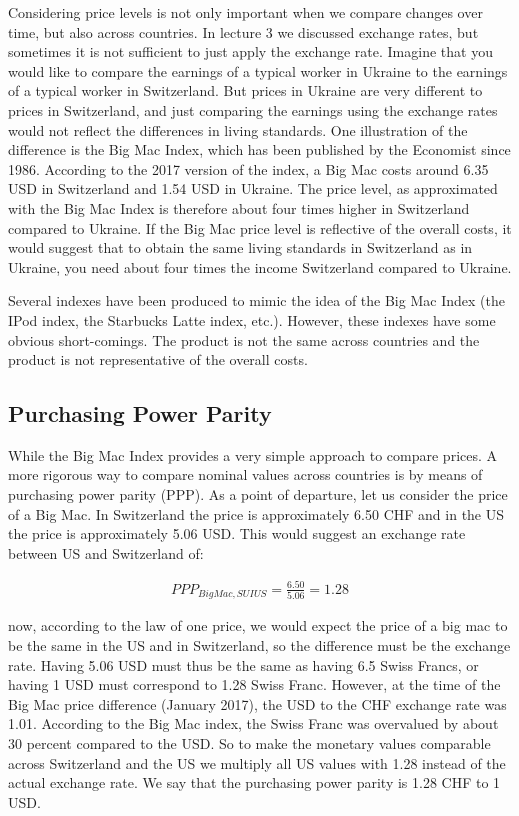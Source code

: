 \documentclass[]{book}
\begin{document}
Considering price levels is not only important when we compare changes over time, but also across countries. In lecture 3 we discussed exchange rates, but sometimes it is not sufficient to just apply the exchange rate. Imagine that you would like to compare the earnings of a typical worker in Ukraine to the earnings of a typical worker in Switzerland. But prices in Ukraine are very different to prices in Switzerland, and just comparing the earnings using the exchange rates would not reflect the differences in living standards. One illustration of the difference is the Big Mac Index, which has been published by the Economist since 1986. According to the 2017 version of the index, a Big Mac costs around 6.35 USD in Switzerland and 1.54 USD in Ukraine. The price level, as approximated with the Big Mac Index is therefore about four times higher in Switzerland compared to Ukraine. If the Big Mac price level is reflective of the overall costs, it would suggest that to obtain the same living standards in Switzerland as in Ukraine, you need about four times the income Switzerland compared to Ukraine.

Several indexes have been produced to mimic the idea of the Big Mac Index (the IPod index, the Starbucks Latte index, etc.). However, these indexes have some obvious short-comings. The product is not the same across countries and the product is not representative of the overall costs.

\hypertarget{purchasing-power-parity}{%
\subsection{Purchasing Power Parity}\label{purchasing-power-parity}}

While the Big Mac Index provides a very simple approach to compare prices. A more rigorous way to compare nominal values across countries is by means of purchasing power parity (PPP). As a point of departure, let us consider the price of a Big Mac. In Switzerland the price is approximately 6.50 CHF and in the US the price is approximately 5.06 USD. This would suggest an exchange rate between US and Switzerland of:

\begin{align}
    PPP_{BigMac,SUIUS}=\frac{6.50}{5.06}=1.28
\end{align}

now, according to the law of one price, we would expect the price of a big mac to be the same in the US and in Switzerland, so the difference must be the exchange rate. Having 5.06 USD must thus be the same as having 6.5 Swiss Francs, or having 1 USD must correspond to 1.28 Swiss Franc. However, at the time of the Big Mac price difference (January 2017), the USD to the CHF exchange rate was 1.01. According to the Big Mac index, the Swiss Franc was overvalued by about 30 percent compared to the USD. So to make the monetary values comparable across Switzerland and the US we multiply all US values with 1.28 instead of the actual exchange rate. We say that the purchasing power parity is 1.28 CHF to 1 USD.
\end{document}
